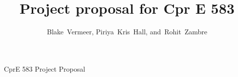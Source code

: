 \documentclass[journal]{IEEEtran}
\begin{document}
%
\title{Project proposal for Cpr E 583}
%
%
%

\author{Blake~Vermeer,
        Piriya~Kris~Hall,
        and~Rohit~Zambre}%

% 
%



%
{CprE 583 Project Proposal}
% 
\end{document}

